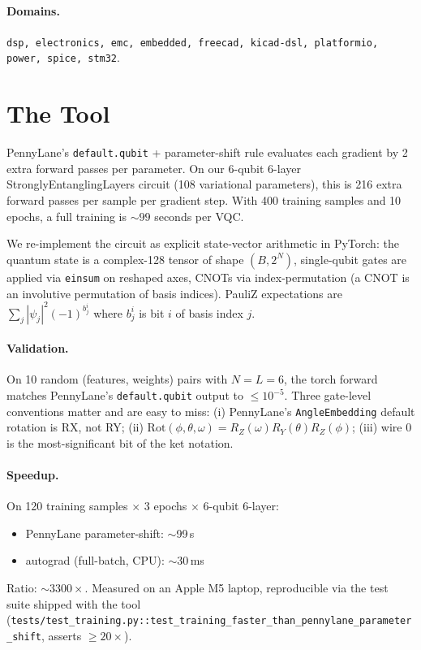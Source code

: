 \paragraph{Domains.} \texttt{dsp, electronics, emc, embedded, freecad, kicad-dsl, platformio, power, spice, stm32}.

\section{The \torchvqc{} Tool}\label{sec:tool}

PennyLane's \texttt{default.qubit} + parameter-shift rule evaluates each gradient by 2 extra forward passes per parameter. On our 6-qubit 6-layer StronglyEntanglingLayers circuit (108 variational parameters), this is 216 extra forward passes per sample per gradient step. With 400 training samples and 10 epochs, a full training is $\sim$$99$ seconds per VQC.

We re-implement the circuit as explicit state-vector arithmetic in PyTorch: the quantum state is a complex-128 tensor of shape $(B, 2^N)$, single-qubit gates are applied via \texttt{einsum} on reshaped axes, CNOTs via index-permutation (a CNOT is an involutive permutation of basis indices). PauliZ expectations are $\sum_j |\psi_j|^2 (-1)^{b_j^i}$ where $b_j^i$ is bit $i$ of basis index $j$.

\paragraph{Validation.} On 10 random (features, weights) pairs with $N=L=6$, the torch forward matches PennyLane's \texttt{default.qubit} output to $\leq 10^{-5}$. Three gate-level conventions matter and are easy to miss: (i) PennyLane's \texttt{AngleEmbedding} default rotation is RX, not RY; (ii) $\mathrm{Rot}(\phi,\theta,\omega) = R_Z(\omega) R_Y(\theta) R_Z(\phi)$; (iii) wire 0 is the most-significant bit of the ket notation.

\paragraph{Speedup.} On 120 training samples $\times$ 3 epochs $\times$ 6-qubit 6-layer:
\begin{itemize}
\item PennyLane parameter-shift: $\sim$99\,s
\item \torchvqc{} autograd (full-batch, CPU): $\sim$30\,ms
\end{itemize}
Ratio: $\sim$$3300\times$. Measured on an Apple M5 laptop, reproducible via the test suite shipped with the tool (\texttt{tests/test\_training.py::test\_training\_faster\_than\_pennylane\_parameter\_shift}, asserts $\geq 20\times$).

